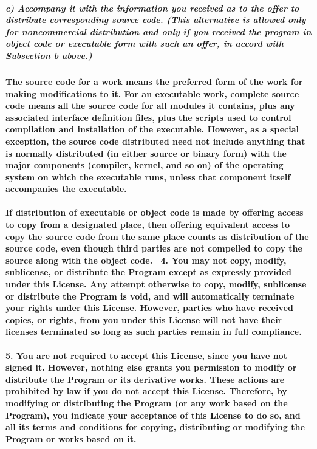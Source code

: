 \documentclass[english,letterpaper]{book}
\begin{document}
\subparagraph{c) Accompany it with the information you received as to the offer
to distribute corresponding source code. (This alternative is allowed
only for noncommercial distribution and only if you received the program
in object code or executable form with such an offer, in accord with
Subsection b above.)}


\paragraph{The source code for a work means the preferred form of the work for
making modifications to it. For an executable work, complete source
code means all the source code for all modules it contains, plus any
associated interface definition files, plus the scripts used to control
compilation and installation of the executable. However, as a special
exception, the source code distributed need not include anything that
is normally distributed (in either source or binary form) with the
major components (compiler, kernel, and so on) of the operating system
on which the executable runs, unless that component itself accompanies
the executable.}


\paragraph{If distribution of executable or object code is made by offering
access to copy from a designated place, then offering equivalent access
to copy the source code from the same place counts as distribution
of the source code, even though third parties are not compelled to
copy the source along with the object code. ~4. You may not copy,
modify, sublicense, or distribute the Program except as expressly
provided under this License. Any attempt otherwise to copy, modify,
sublicense or distribute the Program is void, and will automatically
terminate your rights under this License. However, parties who have
received copies, or rights, from you under this License will not have
their licenses terminated so long as such parties remain in full compliance.}


\paragraph*{5. You are not required to accept this License, since you have not
signed it. However, nothing else grants you permission to modify or
distribute the Program or its derivative works. These actions are
prohibited by law if you do not accept this License. Therefore, by
modifying or distributing the Program (or any work based on the Program),
you indicate your acceptance of this License to do so, and all its
terms and conditions for copying, distributing or modifying the Program
or works based on it.}
\end{document}

